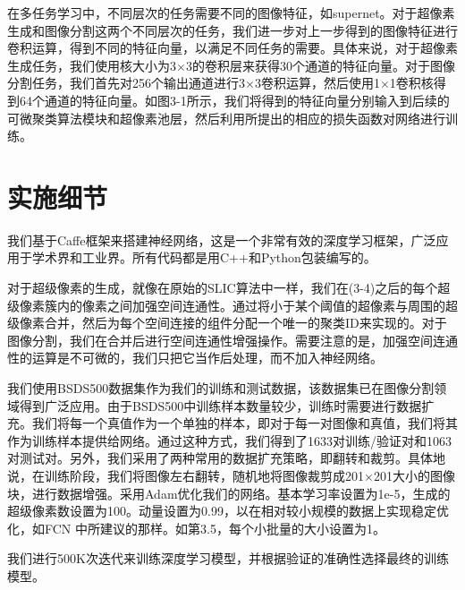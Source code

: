 在多任务学习中，不同层次的任务需要不同的图像特征，如supernet。对于超像素生成和图像分割这两个不同层次的任务，我们进一步对上一步得到的图像特征进行卷积运算，得到不同的特征向量，以满足不同任务的需要。具体来说，对于超像素生成任务，我们使用核大小为3$\times $3的卷积层来获得30个通道的特征向量。对于图像分割任务，我们首先对256个输出通道进行3$\times $3卷积运算，然后使用1$\times $1卷积核得到64个通道的特征向量。如图3-1所示，我们将得到的特征向量分别输入到后续的可微聚类算法模块和超像素池层，然后利用所提出的相应的损失函数对网络进行训练。

\section{实施细节}

我们基于Caffe框架来搭建神经网络，这是一个非常有效的深度学习框架，广泛应用于学术界和工业界。所有代码都是用C++和Python包装编写的。

对于超级像素的生成，就像在原始的SLIC算法中一样，我们在(3-4)之后的每个超级像素簇内的像素之间加强空间连通性。通过将小于某个阈值的超像素与周围的超级像素合并，然后为每个空间连接的组件分配一个唯一的聚类ID来实现的。对于图像分割，我们在合并后进行空间连通性增强操作。需要注意的是，加强空间连通性的运算是不可微的，我们只把它当作后处理，而不加入神经网络。

我们使用BSDS500数据集作为我们的训练和测试数据，该数据集已在图像分割领域得到广泛应用。由于BSDS500中训练样本数量较少，训练时需要进行数据扩充。我们将每一个真值作为一个单独的样本，即对于每一对图像和真值，我们将其作为训练样本提供给网络。通过这种方式，我们得到了1633对训练/验证对和1063对测试对。另外，我们采用了两种常用的数据扩充策略，即翻转和裁剪。具体地说，在训练阶段，我们将图像左右翻转，随机地将图像裁剪成201$\times $201大小的图像块，进行数据增强。采用Adam优化我们的网络。基本学习率设置为1e-5，生成的超级像素数设置为100。动量设置为0.99，以在相对较小规模的数据上实现稳定优化，如FCN 中所建议的那样。如第3.5，每个小批量的大小设置为1。

我们进行500K次迭代来训练深度学习模型，并根据验证的准确性选择最终的训练模型。

